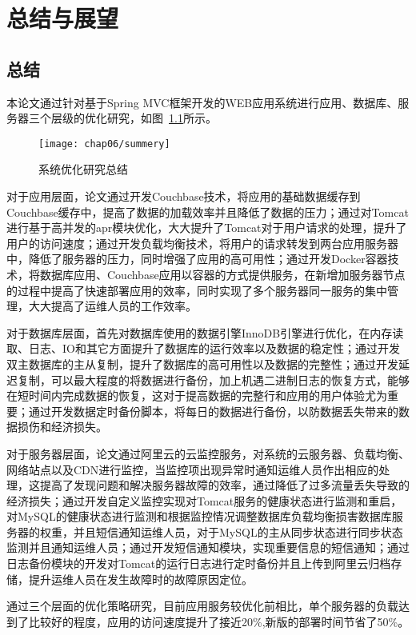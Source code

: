 \chapter{总结与展望}
\label{cha:summarize}
\section{总结}

本论文通过针对基于Spring MVC框架开发的WEB应用系统进行应用、数据库、服务器三个层级的优化研究，如图~\ref{fig:summery}所示。
\begin{figure}[H] %
  \centering
  \texttt{[image: chap06/summery]}
  \caption{系统优化研究总结}
  \label{fig:summery}
\end{figure}

对于应用层面，论文通过开发Couchbase技术，将应用的基础数据缓存到Couchbase缓存中，提高了数据的加载效率并且降低了数据的压力；通过对Tomcat进行基于高并发的apr模块优化，大大提升了Tomcat对于用户请求的处理，提升了用户的访问速度；通过开发负载均衡技术，将用户的请求转发到两台应用服务器中，降低了服务器的压力，同时增强了应用的高可用性；通过开发Docker容器技术，将数据库应用、Couchbase应用以容器的方式提供服务，在新增加服务器节点的过程中提高了快速部署应用的效率，同时实现了多个服务器同一服务的集中管理，大大提高了运维人员的工作效率。

对于数据库层面，首先对数据库使用的数据引擎InnoDB引擎进行优化，在内存读取、日志、IO和其它方面提升了数据库的运行效率以及数据的稳定性；通过开发双主数据库的主从复制，提升了数据库的高可用性以及数据的完整性；通过开发延迟复制，可以最大程度的将数据进行备份，加上机遇二进制日志的恢复方式，能够在短时间内完成数据的恢复，这对于提高数据的完整行和应用的用户体验尤为重要；通过开发数据定时备份脚本，将每日的数据进行备份，以防数据丢失带来的数据损伤和经济损失。

对于服务器层面，论文通过阿里云的云监控服务，对系统的云服务器、负载均衡、网络站点以及CDN进行监控，当监控项出现异常时通知运维人员作出相应的处理，这提高了发现问题和解决服务器故障的效率，通过降低了过多流量丢失导致的经济损失；通过开发自定义监控实现对Tomcat服务的健康状态进行监测和重启，对MySQL的健康状态进行监测和根据监控情况调整数据库负载均衡损害数据库服务器的权重，并且短信通知运维人员，对于MySQL的主从同步状态进行同步状态监测并且通知运维人员；通过开发短信通知模块，实现重要信息的短信通知；通过日志备份模块的开发对Tomcat的运行日志进行定时备份并且上传到阿里云归档存储，提升运维人员在发生故障时的故障原因定位。

通过三个层面的优化策略研究，目前应用服务较优化前相比，单个服务器的负载达到了比较好的程度，应用的访问速度提升了接近20\%,新版的部署时间节省了50\%。


